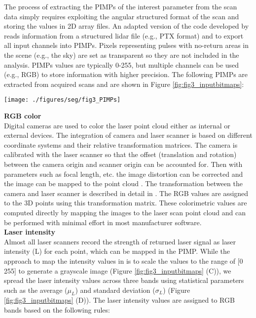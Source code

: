 \documentclass[final,3p,times,twocolumn,authoryear]{elsarticle}
\begin{document}
The process of extracting the PIMPs of the interest parameter from the scan data simply requires exploiting the angular structured format of the scan and storing the values in 2D array files.  An adapted version of the code developed by \cite{olsen2010} reads information from  a  structured  lidar  file  (e.g.,  PTX  format)  and  to  export  all  input  channels  into PIMPs. Pixels representing pulses with no-return areas in the scene (e.g., the sky) are set as transparent so they are not included in the analysis. PIMPs values are typically 0-255, but multiple channels can be used (e.g., RGB) to store information with higher precision. The following PIMPs are extracted from acquired scans and are shown in Figure \ref{fig:fig3_inputbitmaps}:\\

\begin{figure*}[h]
	\centering
	\texttt{[image: ./figures/seg/fig3\_PIMPs]}
	\caption{Generated PIMPs a) RGB from single shot digital images B) range C) laser intensity in grayscale D) laser intensity spread in RGB bands E) vertical normal F) horizontal normal G) normal vector spread in RGB bands H) incidence angle.}
	\label{fig:fig3_inputbitmaps}
\end{figure*}


\noindent \textbf{RGB color}\\
\indent Digital cameras are used to color the laser point cloud either as internal or external devices. The integration of camera and laser scanner is based on different coordinate systems and their relative transformation matrices. The camera is calibrated with the laser scanner so that the offset (translation and rotation) between the camera origin and scanner origin can be accounted for.  Then with parameters such as focal length, etc. the image distortion can be corrected and the image can be mapped to the point cloud \cite{riscan,cyclone}. The transformation between the camera and laser scanner is described in detail in \cite{barnea2008,barnea2012}. The RGB values are assigned to the 3D points using this transformation matrix.  These colorimetric values are computed directly by mapping the images to the laser scan point cloud and can be performed with minimal effort in most manufacturer software.\\

\noindent \textbf{Laser intensity}\\
\indent Almost all laser scanners record the strength of returned laser signal as laser intensity (L) for each point, which can be mapped in the PIMP. While the approach to map the intensity values in \cite{olsen2010,barnea2007,barnea2008,barnea2012,barnea2013} is to scale the values to the range of [0 255] to generate a grayscale image (Figure \ref{fig:fig3_inputbitmaps} (C)), we spread the laser intensity values across three bands using statistical parameters such as the average ($\mu_L$) and standard deviation ($\sigma_L$) (Figure \ref{fig:fig3_inputbitmaps} (D)). The laser intensity values are assigned to RGB bands based on the following rules:
\end{document}
